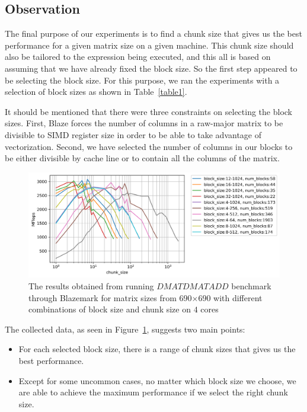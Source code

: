 \subsection{Observation}
The final purpose of our experiments is to find a chunk size that gives us the best performance for a given matrix size on a given machine. This chunk size should also be tailored to the expression being executed, and this all is based on assuming that we have already fixed the block size.
So the first step appeared to be selecting the block size. For this purpose, we ran the experiments with a selection of block sizes as shown in Table~\ref{table1}.


It should be mentioned that there were three constraints on selecting the block sizes. First, Blaze forces the number of columns in a raw-major matrix to be divisible to SIMD register size in order to be able to take advantage of vectorization. Second, we have selected the number of columns in our blocks to be either divisible by cache line or to contain all the columns of the matrix.     


\begin{figure}[H]
	\centering
	\includegraphics[width=1\linewidth]{images/fig5.png}
	\caption{The results obtained from running $DMATDMATADD$ benchmark through Blazemark for matrix sizes from 690$\times$690 with different combinations of block size and chunk size on $4$ cores}	
	\label{fig5}
\end{figure}

The collected data, as seen in Figure~\ref{fig5}, suggests two main points:
\begin{itemize}
	\item For each selected block size, there is a range of chunk sizes that gives us the best performance. 
	\item Except for some uncommon cases, no matter which block size we choose, we are able to achieve the maximum performance if we select the right chunk size.  
\end{itemize}

